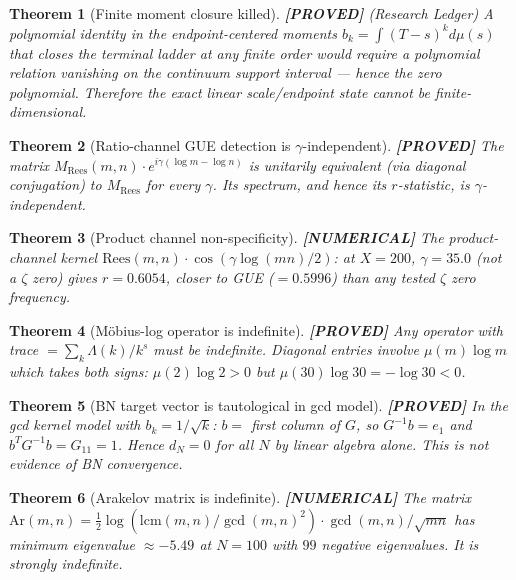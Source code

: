 \documentclass[11pt]{article}
\newtheorem{theorem}{Theorem}[section]
\theoremstyle{remark}
\newcommand{\PROVED}{\textbf{\color{blue}[PROVED]}}
\newcommand{\NUMERICAL}{\textbf{\color{orange}[NUMERICAL]}}
\begin{document}
\begin{theorem}[Finite moment closure killed] \PROVED{} (Research Ledger)
A polynomial identity in the endpoint-centered moments $b_k = \int (T-s)^k d\mu(s)$
that closes the terminal ladder at any finite order would require a polynomial relation
vanishing on the continuum support interval --- hence the zero polynomial.
Therefore the exact linear scale/endpoint state cannot be finite-dimensional.
\end{theorem}

\begin{theorem}[Ratio-channel GUE detection is $\gamma$-independent] \PROVED{}
The matrix $M_{\mathrm{Rees}}(m,n) \cdot e^{i\gamma(\log m - \log n)}$ is unitarily equivalent
(via diagonal conjugation) to $M_{\mathrm{Rees}}$ for every $\gamma$.
Its spectrum, and hence its $r$-statistic, is $\gamma$-independent.
\end{theorem}

\begin{theorem}[Product channel non-specificity] \NUMERICAL{}
The product-channel kernel $\mathrm{Rees}(m,n) \cdot \cos(\gamma \log(mn)/2)$:
at $X=200$, $\gamma = 35.0$ (not a $\zeta$ zero) gives $r = 0.6054$,
closer to GUE ($= 0.5996$) than any tested $\zeta$ zero frequency.
\end{theorem}

\begin{theorem}[M\"obius-log operator is indefinite] \PROVED{}
Any operator with trace $= \sum_k \Lambda(k)/k^s$ must be indefinite.
Diagonal entries involve $\mu(m) \log m$ which takes both signs:
$\mu(2)\log 2 > 0$ but $\mu(30)\log 30 = -\log 30 < 0$.
\end{theorem}

\begin{theorem}[BN target vector is tautological in gcd model] \PROVED{}
In the gcd kernel model with $b_k = 1/\sqrt{k}$:
$b = $ first column of $G$, so $G^{-1}b = e_1$ and $b^T G^{-1} b = G_{11} = 1$.
Hence $d_N = 0$ for all $N$ by linear algebra alone.
This is not evidence of BN convergence.
\end{theorem}

\begin{theorem}[Arakelov matrix is indefinite] \NUMERICAL{}
The matrix $\mathrm{Ar}(m,n) = \frac{1}{2}\log(\mathrm{lcm}(m,n)/\gcd(m,n)^2) \cdot \gcd(m,n)/\sqrt{mn}$
has minimum eigenvalue $\approx -5.49$ at $N=100$ with $99$ negative eigenvalues.
It is strongly indefinite.
\end{theorem}
\end{document}
